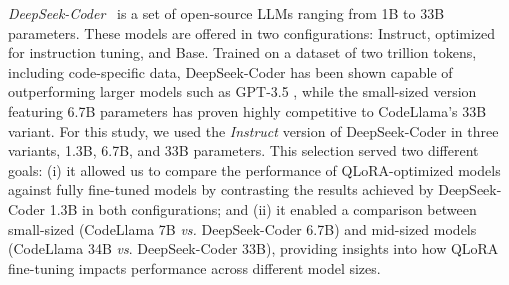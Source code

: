 \textit{DeepSeek-Coder}~\cite{deepseek} is a set of open-source LLMs ranging from 1B to 33B parameters. These models are offered in two configurations: Instruct, optimized for instruction tuning, and Base. Trained on a dataset of two trillion tokens, including code-specific data, DeepSeek-Coder has been shown capable of outperforming larger models such as GPT-3.5  \cite{brown2020language}, while the small-sized version featuring 6.7B parameters has proven highly competitive to CodeLlama's 33B variant. For this study, we used the \emph{Instruct} version of DeepSeek-Coder in three variants, 1.3B, 6.7B, and 33B parameters. This selection served two different goals: 
 (i) it allowed us to compare the performance of QLoRA-optimized models against fully fine-tuned models by contrasting the results achieved by DeepSeek-Coder 1.3B in both configurations; and (ii) it enabled a comparison between small-sized (CodeLlama 7B \emph{vs.} DeepSeek-Coder 6.7B) and mid-sized models (\eg CodeLlama 34B \emph{vs}. DeepSeek-Coder 33B), providing insights into how QLoRA fine-tuning impacts performance across different model sizes.




